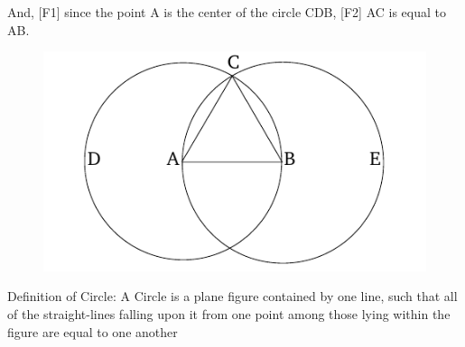 \documentclass[11pt]{article}
\begin{document}
\noindent And, [F1] since the point A is the center of the circle CDB, [F2] AC is equal to AB.

\begin{figure}[h!]
\centering
\includegraphics[scale=0.7]{circle}
\end{figure}

\noindent Definition of Circle: A Circle is a plane figure contained by one line, such that all of the straight-lines falling upon it from one point among those lying within the figure are equal to one another
\end{document}
